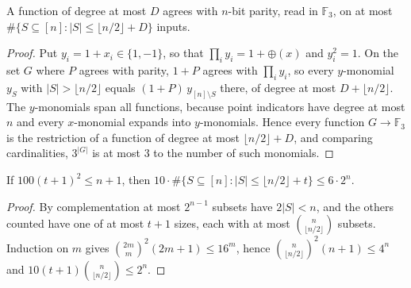 \begin{theorem}
  \label{thm:lowerbounds-smolensky-parity}
  \leanok
  A function of degree at most $D$ agrees with $n$-bit parity, read in
  $\mathbb{F}_3$, on at most
  $\#\{S \subseteq [n] : |S| \le \lfloor n/2 \rfloor + D\}$ inputs.
\end{theorem}
\begin{proof}
  \leanok
  Put $y_i = 1 + x_i \in \{1, -1\}$, so that $\prod_i y_i = 1 + \oplus(x)$ and
  $y_i^2 = 1$. On the set $G$ where $P$ agrees with parity, $1 + P$ agrees with
  $\prod_i y_i$, so every $y$-monomial $y_S$ with $|S| > \lfloor n/2 \rfloor$
  equals $(1 + P)\, y_{[n] \setminus S}$ there, of degree at most
  $D + \lfloor n/2 \rfloor$. The $y$-monomials span all functions, because point
  indicators have degree at most $n$ and every $x$-monomial expands into
  $y$-monomials. Hence every function $G \to \mathbb{F}_3$ is the restriction of
  a function of degree at most $\lfloor n/2 \rfloor + D$, and comparing
  cardinalities, $3^{|G|}$ is at most $3$ to the number of such monomials.
\end{proof}

\begin{lemma}
  \label{lem:lowerbounds-smolensky-binomial}
  \leanok
  If $100 (t + 1)^2 \le n + 1$, then
  $10 \cdot \#\{S \subseteq [n] : |S| \le \lfloor n/2 \rfloor + t\} \le 6 \cdot 2^n$.
\end{lemma}
\begin{proof}
  \leanok
  By complementation at most $2^{n-1}$ subsets have $2|S| < n$, and the others
  counted have one of at most $t + 1$ sizes, each with at most
  $\binom{n}{\lfloor n/2 \rfloor}$ subsets. Induction on $m$ gives
  $\binom{2m}{m}^2 (2m + 1) \le 16^m$, hence
  $\binom{n}{\lfloor n/2 \rfloor}^2 (n + 1) \le 4^n$ and
  $10 (t + 1) \binom{n}{\lfloor n/2 \rfloor} \le 2^n$.
\end{proof}

